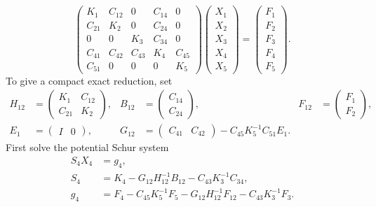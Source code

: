 \documentclass[11pt,a4paper]{article}
\theoremstyle{definition}
\numberwithin{equation}{section}
\begin{document}
\begin{equation}\label{eq:block-system}
 \begin{pmatrix}
 K_1&C_{12}&0&C_{14}&0\\
 C_{21}&K_2&0&C_{24}&0\\
 0&0&K_3&C_{34}&0\\
 C_{41}&C_{42}&C_{43}&K_4&C_{45}\\
 C_{51}&0&0&0&K_5
 \end{pmatrix}
 \begin{pmatrix}X_1\\ X_2\\ X_3\\ X_4\\ X_5\end{pmatrix}
 =\begin{pmatrix}F_1\\F_2\\F_3\\F_4\\F_5\end{pmatrix}.
\end{equation}
To give a compact exact reduction, set
\begin{equation}\label{eq:schur-definitions}
\begin{aligned}
 H_{12}&=\begin{pmatrix}K_1&C_{12}\\C_{21}&K_2\end{pmatrix},&
 B_{12}&=\begin{pmatrix}C_{14}\\C_{24}\end{pmatrix},&
 F_{12}&=\begin{pmatrix}F_1\\F_2\end{pmatrix},\\
 E_1&=\begin{pmatrix}I&0\end{pmatrix},&
 G_{12}&=\begin{pmatrix}C_{41}&C_{42}\end{pmatrix}
              -C_{45}K_5^{-1}C_{51}E_1.
\end{aligned}
\end{equation}
First solve the potential Schur system
\begin{equation}\label{eq:schur}
\begin{aligned}
 S_4X_4&=g_4,\\
 S_4&=K_4-G_{12}H_{12}^{-1}B_{12}-C_{43}K_3^{-1}C_{34},\\
 g_4&=F_4-C_{45}K_5^{-1}F_5-G_{12}H_{12}^{-1}F_{12}-C_{43}K_3^{-1}F_3.
\end{aligned}
\end{equation}
\end{document}

